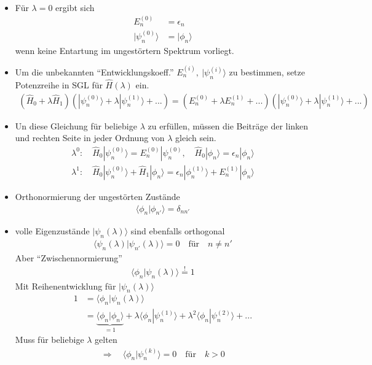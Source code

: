 \documentclass[10pt,article,colorback,accentcolor=tud9d]{scrartcl}
\begin{document}
\begin{itemize}
\begin{align}
    \end{align}
  \item Für $\lambda=0$ ergibt sich 
    \begin{align}
    E_n^{(0)}&=\epsilon_n\\
    |\psi_n^{(0)}\rangle&=|\phi_n\rangle
    \end{align}
    wenn keine Entartung im ungestörtern Spektrum vorliegt.
  \item Um die unbekannten "`Entwicklungskoeff."' $E_n^{(i)},\ |\psi_n^{(i)}\rangle$ zu bestimmen, setze Potenzreihe in SGL für $\hat{H}(\lambda)$ ein. 
    \begin{align}
    (\hat{H}_0+\lambda\hat{H}_1)(|\psi_n^{(0)}\rangle+\lambda|\psi_n^{(1)}\rangle+...)=(E_n^{(0)}+\lambda E_n^{(1)}+...)(|\psi_n^{(0)}\rangle+\lambda|\psi_n^{(1)}\rangle+...)
    \end{align}
  \item Un diese Gleichung für beliebige $\lambda$ zu erfüllen, müssen die Beiträge der linken und rechten Seite in jeder Ordnung von $\lambda$ gleich sein.
    \begin{align}
    \lambda^0:\quad \hat{H}_0|\psi_n^{(0)}\rangle=E_n^{(0)}|\psi_n^{(0)},\quad
    \hat{H}_0|\phi_n\rangle=\epsilon_n|\phi_n\rangle\\
    \lambda^1:\quad \hat{H}_0|\psi_n^{(0)}\rangle+\hat{H}_1|\phi_n\rangle=\epsilon_n|\phi_n^{(1)}\rangle+E_n^{(1)}|\phi_n\rangle
    \end{align}
  \item Orthonormierung der ungestörten Zustände
    \begin{align}
    \langle\phi_n|\phi_{n'}\rangle=\delta_{nn'}
    \end{align}
  \item volle Eigenzustände $|\psi_n(\lambda)\rangle$ sind ebenfalls orthogonal
    \begin{align}
    \langle \psi_n(\lambda)|\psi_{n'}(\lambda)\rangle=0\quad\text{für}\quad n\neq n'
    \end{align}
    Aber "`Zwischennormierung"'
    \begin{align}
    \langle \phi_n|\psi_n(\lambda)\rangle\stackrel{!}{=}1
    \end{align}
    Mit Reihenentwicklung für $|\psi_n(\lambda)\rangle$
    \begin{align}
    1&=\langle \phi_n|\psi_n(\lambda)\rangle\\
    &=\underbrace{\langle\phi_n|\phi_n\rangle}_{=1}+\lambda\langle\phi_n|\psi_n^{(1)}\rangle+\lambda^2\langle\phi_n|\psi_n^{(2)}\rangle+...
    \end{align}
    Muss für beliebige $\lambda$ gelten
    \begin{align}
    \Rightarrow\quad \langle\phi_n|\psi_n^{(k)}\rangle=0\quad\text{für}\quad k>0
    \end{align}
\end{itemize}
\end{document}
